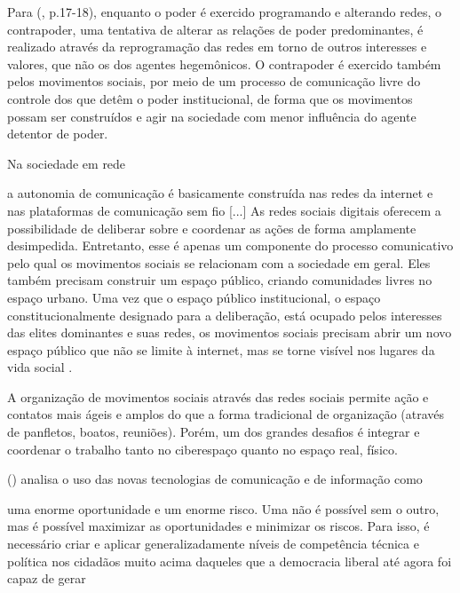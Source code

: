 Para  (\citeyear{castells2013}, p.17-18), enquanto o poder é exercido programando e alterando redes, o contrapoder, uma tentativa de alterar as relações de poder predominantes, é realizado através da reprogramação das redes em torno de outros interesses e valores, que não os dos agentes hegemônicos. O contrapoder é exercido também pelos movimentos sociais, por meio de um processo de comunicação livre do controle dos que detêm o poder institucional, de forma que os movimentos possam ser construídos e agir na sociedade com menor influência do agente detentor de poder. 

Na sociedade em rede

\begin{citacao}
a autonomia de comunicação é basicamente construída nas redes da internet e nas plataformas de comunicação sem fio [...]  As redes sociais digitais oferecem a possibilidade de deliberar sobre e coordenar as ações de forma amplamente desimpedida. Entretanto, esse é apenas um componente do processo comunicativo pelo qual os movimentos sociais se relacionam com a sociedade em geral. Eles também precisam construir um espaço público, criando comunidades livres no espaço urbano. Uma vez que o espaço público institucional, o espaço constitucionalmente designado para a deliberação, está ocupado pelos interesses das elites dominantes e suas redes, os movimentos sociais precisam abrir um novo espaço público que não se limite à internet, mas se torne visível nos lugares da vida social \cite[p .18-19]{castells2013}.
\end{citacao}

A organização de movimentos sociais através das redes sociais permite ação e contatos mais ágeis e amplos do que a forma tradicional de organização (através de panfletos, boatos, reuniões). Porém, um dos grandes desafios é integrar e coordenar o trabalho tanto no ciberespaço quanto no espaço real, físico.

 (\citeyear{boaventura2005}) analisa o uso das novas tecnologias de comunicação e de informação como 

\begin{citacao}
uma enorme oportunidade e um enorme risco. Uma não é possível sem o outro, mas é possível maximizar as oportunidades e minimizar os riscos. Para isso, é necessário criar e aplicar generalizadamente níveis de competência técnica e política nos cidadãos muito acima daqueles que a democracia liberal até agora foi capaz de gerar \cite[p.90]{boaventura2005}
\end{citacao}


